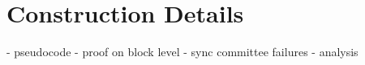 \section{Construction Details}
- pseudocode
    - proof on block level
    - sync committee failures
    - analysis

